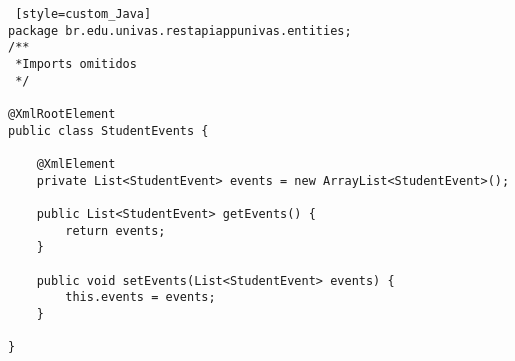 \begin{lstlisting} [style=custom_Java]
package br.edu.univas.restapiappunivas.entities;
/**
 *Imports omitidos
 */

@XmlRootElement
public class StudentEvents {

	@XmlElement
	private List<StudentEvent> events = new ArrayList<StudentEvent>();

	public List<StudentEvent> getEvents() {
		return events;
	}

	public void setEvents(List<StudentEvent> events) {
		this.events = events;
	}

}
\end{lstlisting}

